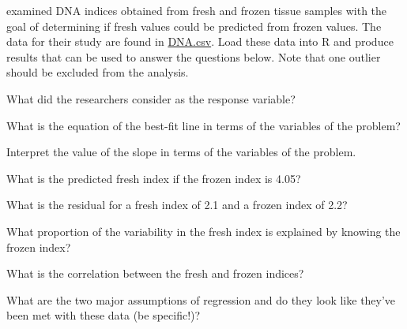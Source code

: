 \documentclass[10pt,openany]{book}\usepackage[]{graphicx}\usepackage[]{color}
\begin{document}
\begin{exsection}
  \item \label{revex:RegDNA} \rhw{} \cite{SuitBauer1990} examined DNA indices obtained from fresh and frozen tissue samples with the goal of determining if fresh values could be predicted from frozen values.  The data for their study are found in \href{https://raw.githubusercontent.com/droglenc/NCData/master/DNA.csv}{DNA.csv}.  Load these data into R and produce results that can be used to answer the questions below.  Note that one outlier should be excluded from the analysis. 
    \begin{Enumerate}
      \item What did the researchers consider as the response variable?
      \item What is the equation of the best-fit line in terms of the variables of the problem?
      \item Interpret the value of the slope in terms of the variables of the problem.
      \item What is the predicted fresh index if the frozen index is 4.05?
      \item What is the residual for a fresh index of 2.1 and a frozen index of 2.2?
      \item What proportion of the variability in the fresh index is explained by knowing the frozen index?
      \item What is the correlation between the fresh and frozen indices?
      \item What are the two major assumptions of regression and do they look like they've been met with these data (be specific!)?
    \end{Enumerate}


\end{exsection}
\end{document}
